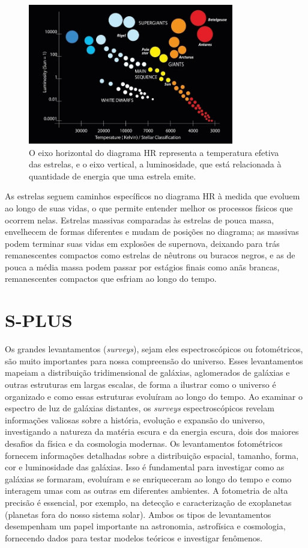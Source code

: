 \begin{figure}[h]
  \centering 
  \includegraphics[width=0.8\textwidth]{Imagens/diagramahr.png} 
  \caption[Diagrama Hertzsprung-Russell.]{O eixo horizontal do diagrama HR representa a temperatura efetiva das estrelas, e o eixo vertical, a luminosidade, que está relacionada à quantidade de energia que uma estrela emite.}
  \label{fig:diagramahr} 
\end{figure}

As estrelas seguem caminhos específicos no diagrama HR à medida que evoluem ao longo de suas vidas, o que permite entender melhor os processos físicos que ocorrem nelas. Estrelas massivas comparadas às estrelas de pouca massa, envelhecem de formas diferentes e mudam de posições no diagrama; as massivas podem terminar suas vidas em explosões de supernova, deixando para trás remanescentes compactos como estrelas de nêutrons ou buracos negros, e as de pouca a média massa podem passar por estágios finais como anãs brancas, remanescentes compactos que esfriam ao longo do tempo.

\section{S-PLUS}

Os grandes levantamentos (\emph{surveys}), sejam eles espectroscópicos ou fotométricos, são muito importantes para nossa compreensão do universo. Esses levantamentos mapeiam a distribuição tridimensional de galáxias, aglomerados de galáxias e outras estruturas em largas escalas, de forma a ilustrar como o universo é organizado e como essas estruturas evoluíram ao longo do tempo. Ao examinar o espectro de luz de galáxias distantes, os \emph{surveys} espectroscópicos revelam informações valiosas sobre a história, evolução e expansão do universo, investigando a natureza da matéria escura e da energia escura, dois dos maiores desafios da física e da cosmologia modernas. Os levantamentos fotométricos fornecem informações detalhadas sobre a distribuição espacial, tamanho, forma, cor e luminosidade das galáxias. Isso é fundamental para investigar como as galáxias se formaram, evoluíram e se enriqueceram ao longo do tempo e como interagem umas com as outras em diferentes ambientes. A fotometria de alta precisão é essencial, por exemplo, na detecção e caracterização de exoplanetas (planetas fora do nosso sistema solar). Ambos os tipos de levantamentos desempenham um papel importante na astronomia, astrofísica e cosmologia, fornecendo dados para testar modelos teóricos e investigar fenômenos. 

